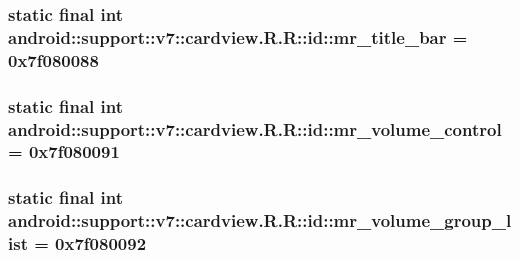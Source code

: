 \hypertarget{classandroid_1_1support_1_1v7_1_1cardview_1_1_r_1_1id_04ed3d6de39b6f035663ed8da95ea39b}{
\subsubsection[{mr\_\-title\_\-bar}]{\setlength{\rightskip}{0pt plus 5cm}static final int android::support::v7::cardview.R.R::id::mr\_\-title\_\-bar = 0x7f080088}}
\label{classandroid_1_1support_1_1v7_1_1cardview_1_1_r_1_1id_04ed3d6de39b6f035663ed8da95ea39b}


\hypertarget{classandroid_1_1support_1_1v7_1_1cardview_1_1_r_1_1id_7355f43d0c8280d2eb08bb65585d87e0}{
\subsubsection[{mr\_\-volume\_\-control}]{\setlength{\rightskip}{0pt plus 5cm}static final int android::support::v7::cardview.R.R::id::mr\_\-volume\_\-control = 0x7f080091}}
\label{classandroid_1_1support_1_1v7_1_1cardview_1_1_r_1_1id_7355f43d0c8280d2eb08bb65585d87e0}


\hypertarget{classandroid_1_1support_1_1v7_1_1cardview_1_1_r_1_1id_c6e901a1288a2ba971cd31eef0026af7}{
\subsubsection[{mr\_\-volume\_\-group\_\-list}]{\setlength{\rightskip}{0pt plus 5cm}static final int android::support::v7::cardview.R.R::id::mr\_\-volume\_\-group\_\-list = 0x7f080092}}
\label{classandroid_1_1support_1_1v7_1_1cardview_1_1_r_1_1id_c6e901a1288a2ba971cd31eef0026af7}



